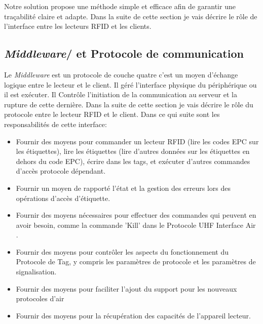 \documentclass[11pt, a4paper, twoside]{book}
\begin{document}
Notre solution propose une méthode simple et efficace afin de garantir une traçabilité claire et adapte. Dans la suite de cette section je vais décrire le rôle de l'interface entre les lecteurs RFID et les clients.
\subsection{\emph{Middleware}/ et Protocole de communication}
Le \emph{Middleware} est un protocole de couche quatre  c'est un moyen d'échange logique entre le lecteur et le client. Il géré l'interface physique du périphérique ou il est exécuter. Il Contrôle l'initiation de la communication au serveur et la rupture de cette dernière. Dans la suite de cette section je vais décrire le rôle du protocole entre le lecteur RFID et le client. Dans ce qui suite sont les responsabilités de cette interface:
\begin{itemize}
\item Fournir des moyens pour commander un lecteur RFID  (lire les codes EPC sur les étiquettes), lire les étiquettes (lire d'autres données sur les étiquettes en dehors du code EPC), écrire dans les tags, et exécuter d'autres commandes d'accès protocole dépendant.
\item 
Fournir un moyen de rapporté l'état et la gestion des erreurs lors des opérations d'accès d'étiquette.
\item 
Fournir des moyens  nécessaires pour effectuer des commandes qui peuvent en avoir besoin, comme la commande 'Kill' dans le Protocole UHF Interface Air \cite{air}.
\item 
Fournir des moyens pour contrôler les aspects du fonctionnement du Protocole de Tag, y compris les paramètres de protocole et les paramètres de signalisation.
\item 
Fournir des moyens pour faciliter l'ajout du support pour les nouveaux protocoles d'air
\item 
Fournir des moyens pour la récupération des capacités de l'appareil lecteur.\\
\end{itemize}
\end{document}
